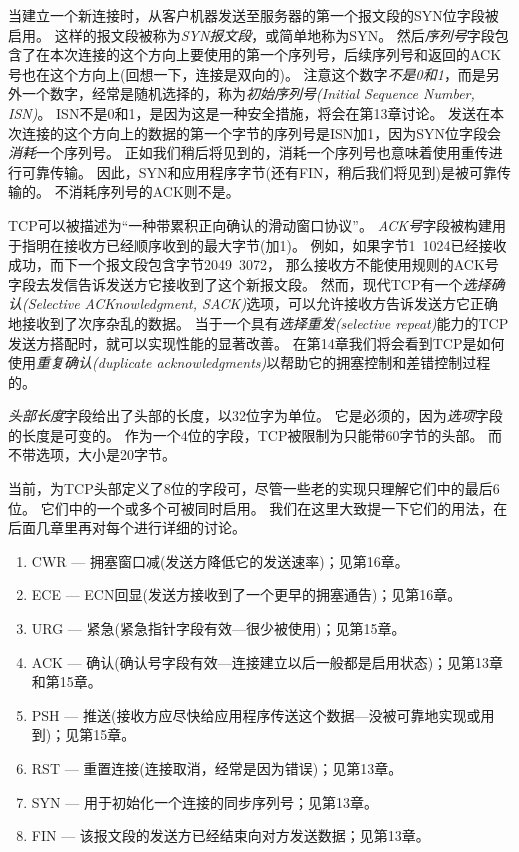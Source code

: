 \documentclass{../main.tex}{subfiles}
\begin{document}
当建立一个新连接时，从客户机器发送至服务器的第一个报文段的SYN位字段被启用。
这样的报文段被称为\emph{SYN报文段}，或简单地称为SYN。
然后\emph{序列号}字段包含了在本次连接的这个方向上要使用的第一个序列号，后续序列号和返回的ACK号也在这个方向上(回想一下，连接是双向的)。
注意这个数字\emph{不是0和1}，而是另外一个数字，经常是随机选择的，称为\emph{初始序列号(Initial Sequence Number, ISN)}。
ISN不是0和1，是因为这是一种安全措施，将会在第13章讨论。
发送在本次连接的这个方向上的数据的第一个字节的序列号是ISN加1，因为SYN位字段会\emph{消耗}一个序列号。
正如我们稍后将见到的，消耗一个序列号也意味着使用重传进行可靠传输。
因此，SYN和应用程序字节(还有FIN，稍后我们将见到)是被可靠传输的。
不消耗序列号的ACK则不是。

TCP可以被描述为``一种带累积正向确认的滑动窗口协议''。
\emph{ACK号}字段被构建用于指明在接收方已经顺序收到的最大字节(加1)。
例如，如果字节1~1024已经接收成功，而下一个报文段包含字节2049~3072，
    那么接收方不能使用规则的ACK号字段去发信告诉发送方它接收到了这个新报文段。
然而，现代TCP有一个\emph{选择确认(Selective ACKnowledgment, SACK)}选项，可以允许接收方告诉发送方它正确地接收到了次序杂乱的数据。
当于一个具有\emph{选择重发(selective repeat)}能力的TCP发送方搭配时，就可以实现性能的显著改善。
在第14章我们将会看到TCP是如何使用\emph{重复确认(duplicate acknowledgments)}以帮助它的拥塞控制和差错控制过程的。

\emph{头部长度}字段给出了头部的长度，以32位字为单位。
它是必须的，因为\emph{选项}字段的长度是可变的。
作为一个4位的字段，TCP被限制为只能带60字节的头部。
而不带选项，大小是20字节。

当前，为TCP头部定义了8位的字段可，尽管一些老的实现只理解它们中的最后6位。
它们中的一个或多个可被同时启用。
我们在这里大致提一下它们的用法，在后面几章里再对每个进行详细的讨论。
\begin{enumerate}
    \item CWR --- 拥塞窗口减(发送方降低它的发送速率)；见第16章。
    \item ECE --- ECN回显(发送方接收到了一个更早的拥塞通告)；见第16章。
    \item URG --- 紧急(紧急指针字段有效---很少被使用)；见第15章。
    \item ACK --- 确认(确认号字段有效---连接建立以后一般都是启用状态)；见第13章和第15章。
    \item PSH --- 推送(接收方应尽快给应用程序传送这个数据---没被可靠地实现或用到)；见第15章。
    \item RST --- 重置连接(连接取消，经常是因为错误)；见第13章。
    \item SYN --- 用于初始化一个连接的同步序列号；见第13章。
    \item FIN --- 该报文段的发送方已经结束向对方发送数据；见第13章。
\end{enumerate}
\end{document}
